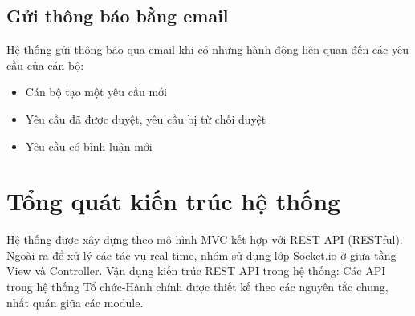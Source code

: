 \subsection{Gửi thông báo bằng email}
Hệ thống gửi thông báo qua email khi có những hành động liên quan đến các yêu cầu của cán bộ:
\begin{itemize}
    \item Cán bộ tạo một yêu cầu mới
    \item Yêu cầu đã được duyệt, yêu cầu bị từ chối duyệt
    \item Yêu cầu có bình luận mới
\end{itemize}
\section{Tổng quát kiến trúc hệ thống}
\indent 
    Hệ thống được xây dựng theo mô hình MVC kết hợp với REST API (RESTful). Ngoài ra để xử lý các tác vụ real time, nhóm sử dụng lớp Socket.io ở giữa tầng View và Controller.
Vận dụng kiến trúc REST API trong hệ thống:
Các API trong hệ thống Tổ chức-Hành chính được thiết kế theo các nguyên tắc chung, nhất quán giữa các module.
